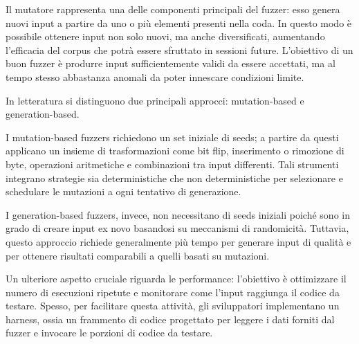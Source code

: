 Il mutatore rappresenta una delle componenti principali del fuzzer: esso genera nuovi input a partire da uno o più elementi presenti nella coda. In questo modo è possibile ottenere input non solo nuovi, ma anche diversificati, aumentando l’efficacia del corpus che potrà essere sfruttato in sessioni future. L’obiettivo di un buon fuzzer è produrre input sufficientemente validi da essere accettati, ma al tempo stesso abbastanza anomali da poter innescare condizioni limite. 

In letteratura si distinguono due principali approcci: mutation-based e generation-based.

I mutation-based fuzzers richiedono un set iniziale di seeds; a partire da questi applicano un insieme di trasformazioni come bit flip, inserimento o rimozione di byte, operazioni aritmetiche e combinazioni tra input differenti. Tali strumenti integrano strategie sia deterministiche che non deterministiche per selezionare e schedulare le mutazioni a ogni tentativo di generazione.

I generation-based fuzzers, invece, non necessitano di seeds iniziali poiché sono in grado di creare input ex novo basandosi su meccanismi di randomicità. Tuttavia, questo approccio richiede generalmente più tempo per generare input di qualità e per ottenere risultati comparabili a quelli basati su mutazioni.

Un ulteriore aspetto cruciale riguarda le performance: l’obiettivo è ottimizzare il numero di esecuzioni ripetute e monitorare come l’input raggiunga il codice da testare. Spesso, per facilitare questa attività, gli sviluppatori implementano un harness, ossia un frammento di codice progettato per leggere i dati forniti dal fuzzer e invocare le porzioni di codice da testare.

